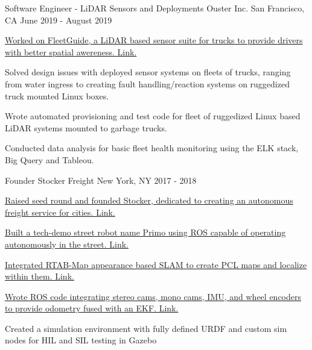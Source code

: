 \begin{cventries}
  \cventry
    {Software Engineer - LiDAR Sensors and Deployments} %
    {Ouster Inc.} %
    {San Francisco, CA} %
    {June 2019 - August 2019} %
    {
      \begin{cvitems} %
        \item {\href{https://www.fleetguide.io/}
                {Worked on FleetGuide, a LiDAR based sensor suite for trucks to provide drivers with better spatial awereness. \color{darkblue}Link.}}
        \item {Solved design issues with deployed sensor systems on fleets of trucks, ranging from water ingress to creating fault handling/reaction
        systems on ruggedized truck mounted Linux boxes.}
        \item {Wrote automated provisioning and test code for fleet of ruggedized Linux based LiDAR systems mounted to garbage trucks.}
        \item {Conducted data analysis for basic fleet health monitoring using the ELK stack, Big Query and Tableou.}
      \end{cvitems}
    }

  \cventry
    {Founder} %
    {Stocker Freight} %
    {New York, NY} %
    {2017 - 2018} %
    {
      \begin{cvitems} %
        \item {\href{https://paulsammut.com/lib/exe/fetch.php/seed_deck_r14.pdf}
              {Raised seed round and founded Stocker, dedicated to creating an autonomous freight service for cities. \color{darkblue}Link.}}
        \item {\href{https://paulsammut.com/doku.php/primo_robot}
            {Built a tech-demo street robot name Primo using ROS capable of operating autonomously in the street. \color{darkblue}Link.}}
        \item {\href{https://paulsammut.com/doku.php/stereo_cameras}
            {Integrated RTAB-Map appearance based SLAM to create PCL maps and localize within them. \color{darkblue}Link.}}
        \item {\href{http://bit.ly/2T3d4sU}
            {Wrote ROS code integrating stereo cams, mono cams, IMU, and wheel encoders to provide odometry fused with an EKF. \color{darkblue}Link.}}
        \item {Created a simulation environment with fully defined URDF and custom sim nodes for HIL and SIL testing in Gazebo}
      \end{cvitems}
    }


\end{cventries}
